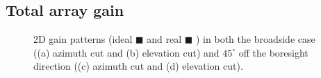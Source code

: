 \documentclass[10 pt,a4paper,twocolumn]{article}
\begin{document}
{\begin{table}[bt!]
\begin{center}
		\label{table:EH fields}
	\end{center}
\end{table} 



\subsection*{Total array gain}

\begin{figure}[bt!]

	\begin{subfigure}{0.24\linewidth}
		\def\svgwidth{\linewidth}
		\fontsize{4}{4}\selectfont{}
		\caption{}
	\end{subfigure}	\hfill
	\begin{subfigure}{0.24\linewidth}
		\def\svgwidth{\linewidth}
	\fontsize{4}{4}\selectfont{}
		\caption{}
	\end{subfigure}	\hfill
	\begin{subfigure}{0.24\linewidth}
		\def\svgwidth{\linewidth}
	\fontsize{4}{4}\selectfont{}
		\caption{}
	\end{subfigure}
	\hfill
	\begin{subfigure}{0.24\linewidth}
		\def\svgwidth{\linewidth}
	\fontsize{4}{4}\selectfont{}
		\caption{}
	\end{subfigure}\hfill
	\caption{2D gain patterns (ideal \textcolor{myOrange}{$\blacksquare$} and real \textcolor{myBlue}{$\blacksquare$} ) in both the broadside case ((a) azimuth cut and (b) elevation cut) and $45^\circ$ off the boresight direction ((c) azimuth cut and (d) elevation cut).}
	\label{fig:array gain}
\end{figure}


}
\end{document}
